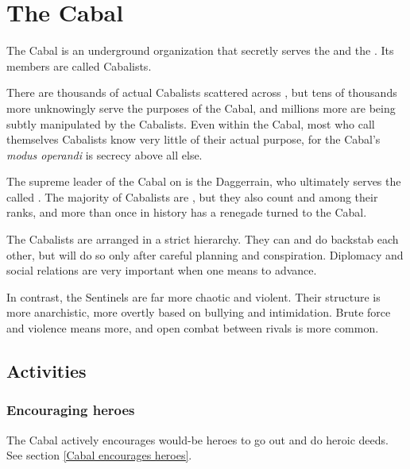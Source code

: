\section{The Cabal}
The Cabal is an underground organization that secretly serves the \resphain{} and the \banes. Its members are called Cabalists.

There are thousands of actual Cabalists scattered across \Miith{}, but tens of thousands more unknowingly serve the purposes of the Cabal, and millions more are being subtly manipulated by the Cabalists. Even within the Cabal, most who call themselves Cabalists know very little of their actual purpose, for the Cabal's \emph{modus operandi} is secrecy above all else. 

The supreme leader of the Cabal on \Miith{} is the \banelord{} Daggerrain, who ultimately serves the \baneking{} called \Voidbringer. The majority of Cabalists are \human{}, but they also count \scathae{} and \meccara{} among their ranks, and more than once in history has a renegade \dragon{} turned to the Cabal. 


The Cabalists are arranged in a strict hierarchy. They can and do backstab each other, but will do so only after careful planning and conspiration. Diplomacy and social relations are very important when one means to advance.

In contrast, the Sentinels are far more chaotic and violent. Their structure is more anarchistic, more overtly based on bullying and intimidation. Brute force and violence means more, and open combat between rivals is more common.









\subsection{Activities}





\subsubsection{Encouraging heroes}
The Cabal actively encourages would-be heroes to go out and do heroic deeds. See section \ref{Cabal encourages heroes}. 





